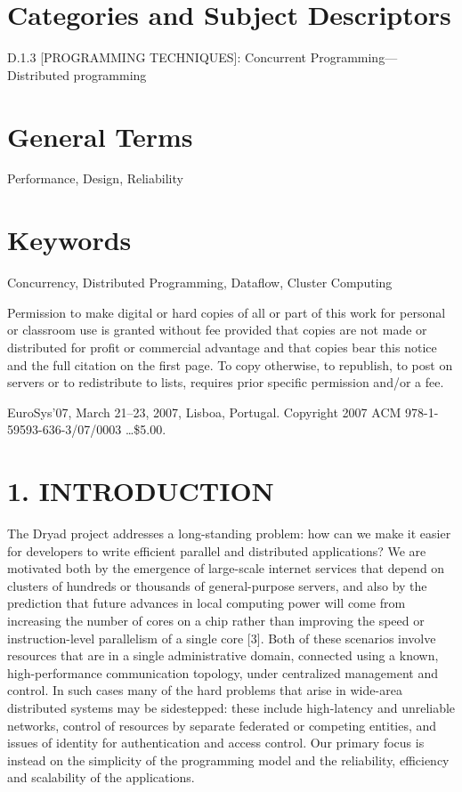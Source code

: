 \documentclass[
]{article}
\begin{document}
\section{Categories and Subject
Descriptors}\label{categories-and-subject-descriptors}

D.1.3 {[}PROGRAMMING TECHNIQUES{]}: Concurrent Programming---Distributed
programming

\section{General Terms}\label{general-terms}

Performance, Design, Reliability

\section{Keywords}\label{keywords}

Concurrency, Distributed Programming, Dataflow, Cluster Computing

Permission to make digital or hard copies of all or part of this work
for personal or classroom use is granted without fee provided that
copies are not made or distributed for profit or commercial advantage
and that copies bear this notice and the full citation on the first
page. To copy otherwise, to republish, to post on servers or to
redistribute to lists, requires prior specific permission and/or a fee.

EuroSys'07, March 21--23, 2007, Lisboa, Portugal. Copyright 2007 ACM
978-1-59593-636-3/07/0003 \ldots\$5.00.

\section{1. INTRODUCTION}\label{introduction}

The Dryad project addresses a long-standing problem: how can we make it
easier for developers to write efficient parallel and distributed
applications? We are motivated both by the emergence of large-scale
internet services that depend on clusters of hundreds or thousands of
general-purpose servers, and also by the prediction that future advances
in local computing power will come from increasing the number of cores
on a chip rather than improving the speed or instruction-level
parallelism of a single core {[}3{]}. Both of these scenarios involve
resources that are in a single administrative domain, connected using a
known, high-performance communication topology, under centralized
management and control. In such cases many of the hard problems that
arise in wide-area distributed systems may be sidestepped: these include
high-latency and unreliable networks, control of resources by separate
federated or competing entities, and issues of identity for
authentication and access control. Our primary focus is instead on the
simplicity of the programming model and the reliability, efficiency and
scalability of the applications.
\end{document}
